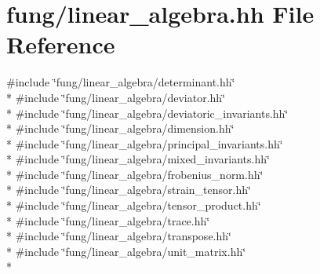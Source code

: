 \hypertarget{linear__algebra_8hh}{}\section{fung/linear\+\_\+algebra.hh File Reference}
\label{linear__algebra_8hh}
{\ttfamily \#include \char`\"{}fung/linear\+\_\+algebra/determinant.\+hh\char`\"{}}\\*
{\ttfamily \#include \char`\"{}fung/linear\+\_\+algebra/deviator.\+hh\char`\"{}}\\*
{\ttfamily \#include \char`\"{}fung/linear\+\_\+algebra/deviatoric\+\_\+invariants.\+hh\char`\"{}}\\*
{\ttfamily \#include \char`\"{}fung/linear\+\_\+algebra/dimension.\+hh\char`\"{}}\\*
{\ttfamily \#include \char`\"{}fung/linear\+\_\+algebra/principal\+\_\+invariants.\+hh\char`\"{}}\\*
{\ttfamily \#include \char`\"{}fung/linear\+\_\+algebra/mixed\+\_\+invariants.\+hh\char`\"{}}\\*
{\ttfamily \#include \char`\"{}fung/linear\+\_\+algebra/frobenius\+\_\+norm.\+hh\char`\"{}}\\*
{\ttfamily \#include \char`\"{}fung/linear\+\_\+algebra/strain\+\_\+tensor.\+hh\char`\"{}}\\*
{\ttfamily \#include \char`\"{}fung/linear\+\_\+algebra/tensor\+\_\+product.\+hh\char`\"{}}\\*
{\ttfamily \#include \char`\"{}fung/linear\+\_\+algebra/trace.\+hh\char`\"{}}\\*
{\ttfamily \#include \char`\"{}fung/linear\+\_\+algebra/transpose.\+hh\char`\"{}}\\*
{\ttfamily \#include \char`\"{}fung/linear\+\_\+algebra/unit\+\_\+matrix.\+hh\char`\"{}}\\*
